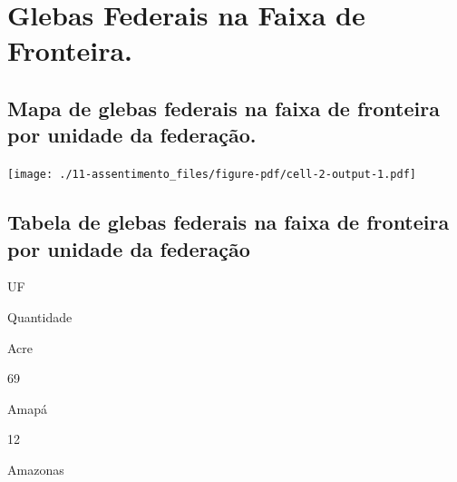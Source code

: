 \documentclass[
  letterpaper,
]{report}
\begin{document}
\hypertarget{glebas-federais-na-faixa-de-fronteira.}{%
\section{Glebas Federais na Faixa de
Fronteira.}\label{glebas-federais-na-faixa-de-fronteira.}}

\hypertarget{mapa-de-glebas-federais-na-faixa-de-fronteira-por-unidade-da-federauxe7uxe3o.}{%
\subsection{Mapa de glebas federais na faixa de fronteira por unidade da
federação.}\label{mapa-de-glebas-federais-na-faixa-de-fronteira-por-unidade-da-federauxe7uxe3o.}}

\texttt{[image: ./11-assentimento\_files/figure-pdf/cell-2-output-1.pdf]}

\hypertarget{tabela-de-glebas-federais-na-faixa-de-fronteira-por-unidade-da-federauxe7uxe3o}{%
\subsection{Tabela de glebas federais na faixa de fronteira por unidade
da
federação}\label{tabela-de-glebas-federais-na-faixa-de-fronteira-por-unidade-da-federauxe7uxe3o}}

\n  

\n    

\n      

UF

\n      

Quantidade

\n    

\n  

\n  

\n    

\n      

Acre

\n      

69

\n    

\n    

\n      

Amapá

\n      

12

\n    

\n    

\n      

Amazonas

\n      
\end{document}
